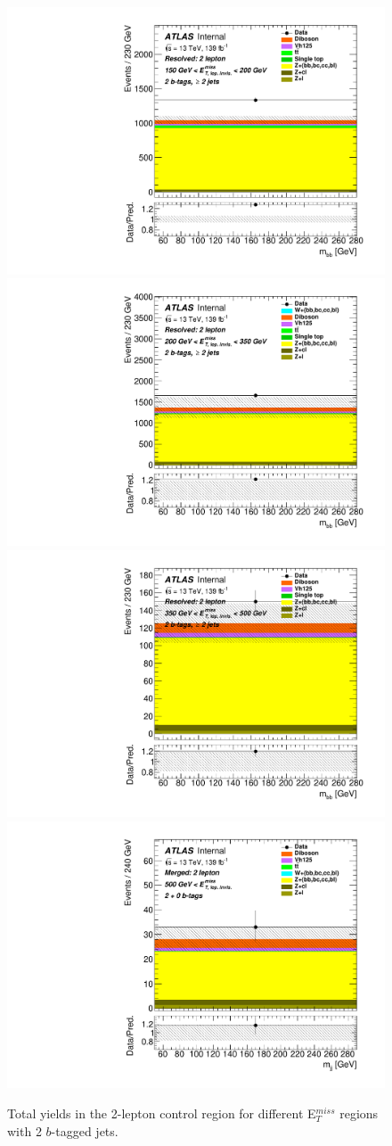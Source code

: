 \begin{figure}[!htb]
  \includegraphics[width=0.46\linewidth]{chapters/c9/figures/Region_distmBB_J2_L2_T2_DCR2_Y2015_incJet1_Fat0_incFat1_BMin150_BMax200_Prefit.pdf}
  \includegraphics[width=0.46\linewidth]{chapters/c9/figures/Region_distmBB_J2_L2_T2_DCR2_Y2015_incJet1_Fat0_incFat1_BMin200_BMax350_Prefit.pdf}\\
  \includegraphics[width=0.46\linewidth]{chapters/c9/figures/Region_distmBB_J2_L2_T2_DCR2_Y2015_incJet1_Fat0_incFat1_BMin350_BMax500_Prefit.pdf}
  \includegraphics[width=0.46\linewidth]{chapters/c9/figures/Region_BMin500_incFat1_Fat1_incJet1_Y2015_DCR2_T20_L2_distmBB_J0_Prefit.pdf}
\caption{Total yields in the 2-lepton control region for different E$_{T}^{miss}$ regions with 2 $b$-tagged jets.}
\label{fig:Data_MC_CR2_ll_m_jj_2b}
\end{figure}



